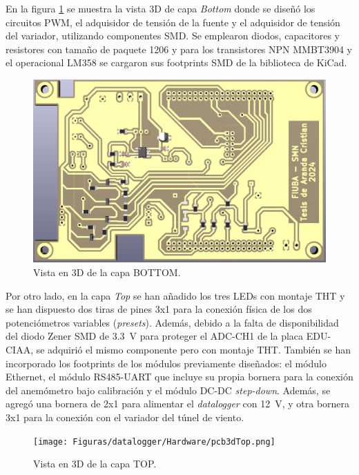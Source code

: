 En la figura \ref{fig:pcb3dBottom} se muestra la vista 3D de capa \textit{Bottom} donde se diseñó los circuitos PWM, el adquisidor de tensión de la fuente y el adquisidor de tensión del variador, utilizando componentes SMD. Se emplearon diodos, capacitores y resistores con tamaño de paquete 1206 y para los transistores NPN MMBT3904 y el operacional LM358 se cargaron sus footprints SMD de la biblioteca de KiCad.


\begin{figure}[H]
    \centering
    \includegraphics[width=0.95\linewidth]{Figuras/datalogger/Hardware/pcb3dBottom.png}
    \caption{Vista en 3D de la capa BOTTOM.}
    \label{fig:pcb3dBottom}
\end{figure}

Por otro lado, en la capa \textit{Top} se han añadido los tres LEDs con montaje THT y se han dispuesto dos tiras de pines 3x1 para la conexión física de los dos potenciómetros variables (\textit{presets}). Además, debido a la falta de disponibilidad del diodo Zener SMD de \SI{3.3}{\volt} para proteger el ADC-CH1 de la placa EDU-CIAA, se adquirió el mismo componente pero con montaje THT. También se han incorporado los footprints de los módulos previamente diseñados: el módulo Ethernet, el módulo RS485-UART que incluye su propia bornera para la conexión del anemómetro bajo calibración y el módulo DC-DC \textit{step-down}. Además, se agregó una bornera de 2x1 para alimentar el \textit{datalogger} con \SI{12}{\volt}, y otra bornera 3x1 para la conexión con el variador del túnel de viento.


\begin{figure}[H]
    \centering
    \texttt{[image: Figuras/datalogger/Hardware/pcb3dTop.png]}
    \caption{Vista en 3D de la capa TOP.}
    \label{fig:pcb3dTop}
\end{figure}


